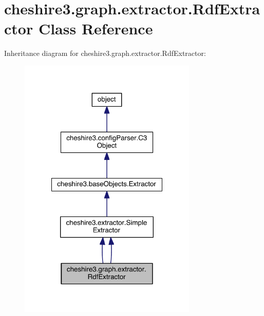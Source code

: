 \hypertarget{classcheshire3_1_1graph_1_1extractor_1_1_rdf_extractor}{\section{cheshire3.\-graph.\-extractor.\-Rdf\-Extractor Class Reference}
\label{classcheshire3_1_1graph_1_1extractor_1_1_rdf_extractor}
}


Inheritance diagram for cheshire3.\-graph.\-extractor.\-Rdf\-Extractor\-:
\nopagebreak
\begin{figure}[H]
\begin{center}
\leavevmode
\includegraphics[width=240pt]{classcheshire3_1_1graph_1_1extractor_1_1_rdf_extractor__inherit__graph}
\end{center}
\end{figure}


